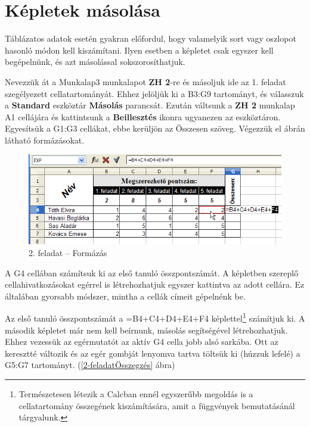 \section{Képletek másolása}

Táblázatos adatok esetén gyakran előfordul, hogy valamelyik
sort vagy oszlopot hasonló módon kell kiszámítani. Ilyen
esetben a képletet csak egyszer kell begépelnünk, és azt
másolással sokszorosíthatjuk.

Nevezzük át a Munkalap3 munkalapot \textbf{ZH 2}-re és
másoljuk ide az 1. feladat szegélyezett cellatartományát. Ehhez
jelöljük ki a B3:G9 tartományt, és válasszuk a
\textbf{Standard} eszköztár \textbf{Másolás} parancsát.
Ezután váltsunk a  \textbf{ZH 2} munkalap A1 cellájára és
kattintsunk a \textbf{Beillesztés} ikonra ugyanezen az
eszköztáron. Egyesítsük a G1:G3 cellákat, ebbe kerüljön
az Összesen szöveg. Végezzük el  ábrán látható
formázásokat.

\begin{figure}[!h]
\begin{center}
\includegraphics[width=14.238cm]{oocalcv1-img23.png}
\caption{2. feladat --  Formázás}\label{2-feladatFormázás}
\end{center}
\end{figure}

A G4 cellában számítsuk ki az első tanuló
összpontszámát. A képletben szereplő cellahivatkozásokat
egérrel is létrehozhatjuk egyszer kattintva az adott cellára. Ez
általában gyorsabb módszer, mintha a cellák címeit
gépelnénk be.

Az első tanuló összpontszámát a =B4+C4+D4+E4+F4
képlettel\footnote{Természetesen létezik a Calcban ennél
egyszerűbb megoldás is a cellatartomány összegének
kiszámítására, amit a  függvények bemutatásánál
tárgyalunk.} számítjuk ki. A második  képletet már nem
kell beírnunk, másolás segítségével létrehozhatjuk. Ehhez
vezessük az egérmutatót az aktív G4 cella jobb alsó
sarkába. Ott az keresztté változik és az egér gombját
lenyomva tartva töltsük ki (húzzuk lefelé) a G5:G7
tartományt. (\ref{2-feladatÖsszegzés} ábra)


